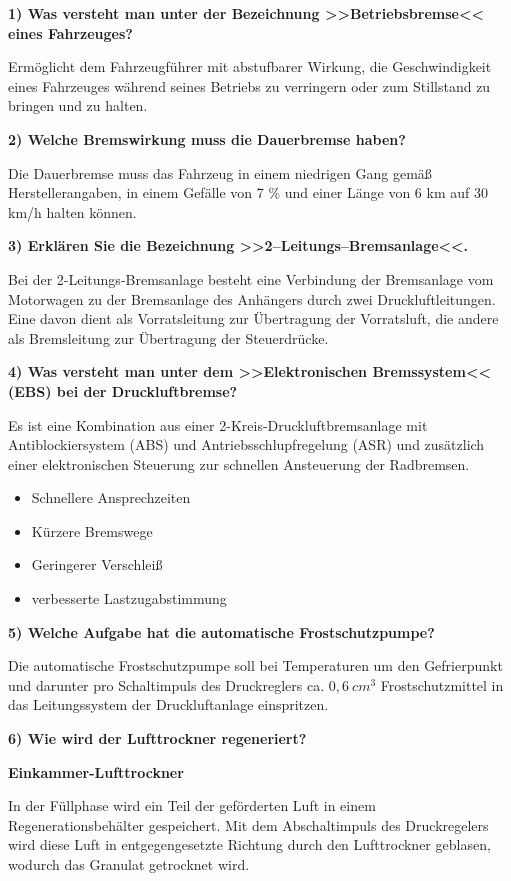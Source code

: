 \textbf{1) Was versteht man unter der Bezeichnung >>Betriebsbremse<<
eines Fahrzeuges?}

Ermöglicht dem Fahrzeugführer mit abstufbarer Wirkung, die
Geschwindigkeit eines Fahrzeuges während seines Betriebs zu verringern
oder zum Stillstand zu bringen und zu halten.

\textbf{2) Welche Bremswirkung muss die Dauerbremse haben?}

Die Dauerbremse muss das Fahrzeug in einem niedrigen Gang gemäß
Herstellerangaben, in einem Gefälle von 7 \% und einer Länge von 6 km
auf 30 km/h halten können.

\textbf{3) Erklären Sie die Bezeichnung >>2--Leitungs--Bremsanlage<<.}

Bei der 2-Leitungs-Bremsanlage besteht eine Verbindung der Bremsanlage
vom Motorwagen zu der Bremsanlage des Anhängers durch zwei
Druckluftleitungen. Eine davon dient als Vorratsleitung zur Übertragung
der Vorratsluft, die andere als Bremsleitung zur Übertragung der
Steuerdrücke.

\textbf{4) Was versteht man unter dem >>Elektronischen Bremssystem<<
(EBS) bei der Druckluftbremse?}

Es ist eine Kombination aus einer 2-Kreis-Druckluftbremsanlage mit
Antiblockiersystem (ABS) und Antriebsschlupfregelung (ASR) und
zusätzlich einer elektronischen Steuerung zur schnellen Ansteuerung der
Radbremsen.

\begin{itemize}
\item
  Schnellere Ansprechzeiten
\item
  Kürzere Bremswege
\item
  Geringerer Verschleiß
\item
  verbesserte Lastzugabstimmung
\end{itemize}

\textbf{5) Welche Aufgabe hat die automatische Frostschutzpumpe?}

Die automatische Frostschutzpumpe soll bei Temperaturen um den
Gefrierpunkt und darunter pro Schaltimpuls des Druckreglers ca.
$0,6~cm^3$ Frostschutzmittel in das Leitungssystem der Druckluftanlage
einspritzen.

\textbf{6) Wie wird der Lufttrockner regeneriert?}

\textbf{Einkammer-Lufttrockner}

In der Füllphase wird ein Teil der geförderten Luft in einem
Regenerationsbehälter gespeichert. Mit dem Abschaltimpuls des
Druckregelers wird diese Luft in entgegengesetzte Richtung durch den
Lufttrockner geblasen, wodurch das Granulat getrocknet wird.

